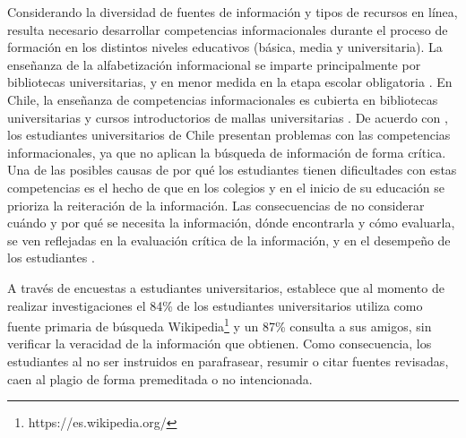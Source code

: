 Considerando la diversidad de fuentes de información y tipos de recursos en línea, resulta necesario desarrollar competencias informacionales durante el proceso de formación en los distintos niveles educativos (básica, media y universitaria). La enseñanza de la alfabetización informacional se imparte principalmente por bibliotecas universitarias, y en menor medida en la etapa escolar obligatoria \parencite{weiner2014teaches}. En Chile, la enseñanza de competencias informacionales es cubierta en bibliotecas universitarias y cursos introductorios de mallas universitarias \parencite{marzal2015diagnostico}. De acuerdo con \textcite{urra2016alfabetizacion}, los estudiantes universitarios de Chile presentan problemas con las competencias informacionales, ya que no aplican la búsqueda de información de forma crítica. Una de las posibles causas de por qué los estudiantes tienen dificultades con estas competencias es el hecho de que en los colegios y en el inicio de su educación se prioriza la reiteración de la información. Las consecuencias de no considerar cuándo y por qué se necesita la información, dónde encontrarla y cómo evaluarla, se ven reflejadas en la evaluación crítica de la información, y en el desempeño de los estudiantes \parencite{urra2016alfabetizacion}. 


A través de encuestas a estudiantes universitarios, \textcite[p.~475]{head2013project} establece que al momento de realizar investigaciones el 84\% de los estudiantes universitarios utiliza como fuente primaria de búsqueda Wikipedia\footnote{https://es.wikipedia.org/} y un 87\% consulta a sus amigos, sin verificar la veracidad de la información que obtienen. Como consecuencia, los estudiantes al no ser instruidos en parafrasear, resumir o citar fuentes revisadas, caen al plagio de forma premeditada o no intencionada. 


